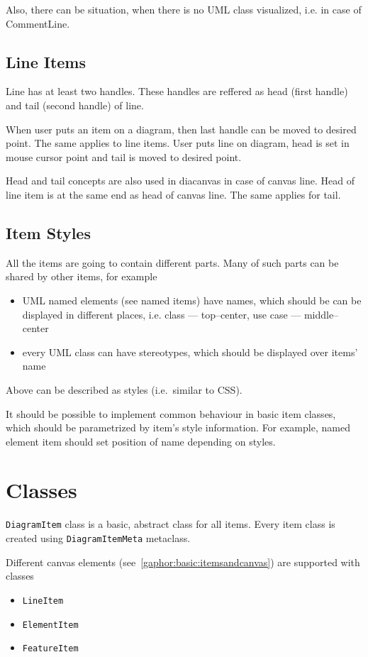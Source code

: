 \documentclass[draft]{book}
\newcommand{\rclass}[1]{\texttt{#1}}
\begin{document}
Also, there can be situation, when there is no UML class visualized, i.e.
in case of CommentLine.

\subsection{Line Items}
Line has at least two handles. These handles are reffered as head (first
handle) and tail (second handle) of line.

When user puts an item on a diagram, then last handle can be moved to
desired point. The same applies to line items. User puts line on diagram,
head is set in mouse cursor point and tail is moved to desired point.

Head and tail concepts are also used in diacanvas in case of canvas line.
Head of line item is at the same end as head of canvas line. The same
applies for tail.

\subsection{Item Styles}
All the items are going to contain different parts.
Many of such parts can be shared by other items, for example
\begin{itemize}
\item UML named elements (see named items) have names, which should be
    can be displayed in different places, i.e. class --- top--center,
    use case --- middle--center
\item every UML class can have stereotypes, which should be displayed
    over items' name
\end{itemize}

Above can be described as styles (i.e.\ similar to CSS).

It should be possible to implement common behaviour in basic item classes,
which should be parametrized by item's style information. For example,
named element item should set position of name depending on styles.


\section{Classes}
\rclass{DiagramItem} class is a basic, abstract class for all items. Every
item class is created using \rclass{DiagramItemMeta} metaclass.

Different canvas elements (see~\ref{gaphor:basic:itemsandcanvas}) are
supported with classes
\begin{itemize}
\itemsep0pt
\item \rclass{LineItem}
\item \rclass{ElementItem}
\item \rclass{FeatureItem}
\end{itemize}
\end{document}

